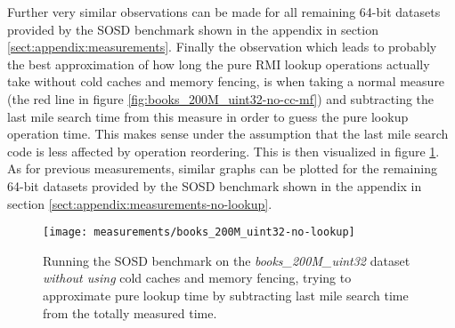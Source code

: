 Further very similar observations can be made for all remaining 64-bit datasets provided by the SOSD benchmark shown in the appendix in section \ref{sect:appendix:measurements}. Finally the observation which leads to probably the best approximation of how long the pure RMI lookup operations actually take without cold caches and memory fencing, is when taking a normal measure (the red line in figure \ref{fig:books_200M_uint32-no-cc-mf}) and subtracting the last mile search time from this measure in order to guess the pure lookup operation time. This makes sense under the assumption that the last mile search code is less affected by operation reordering. This is then visualized in figure \ref{fig:books_200M_uint32-no-lookup}. As for previous measurements, similar graphs can be plotted for the remaining 64-bit datasets provided by the SOSD benchmark shown in the appendix in section \ref{sect:appendix:measurements-no-lookup}.

\begin{figure}[!ht]
  \centering
  \texttt{[image: measurements/books\_200M\_uint32-no-lookup]}
  \caption[Last mile search time measures and lookup time approximation \emph{without using} cold caches and memory fencing]{
    Running the SOSD benchmark on the \emph{books\_200M\_uint32} dataset \emph{without using} cold caches and memory fencing, trying to approximate pure lookup time by subtracting last mile search time from the totally measured time.
  }
  \label{fig:books_200M_uint32-no-lookup}
\end{figure}

